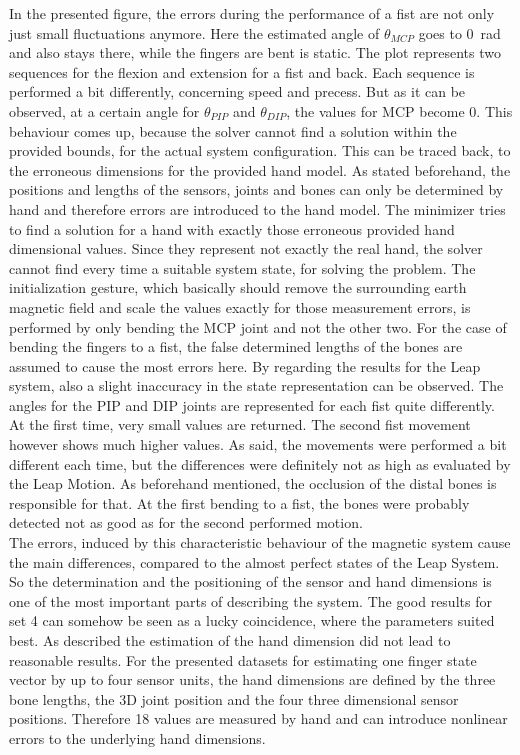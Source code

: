 In the presented figure, the errors during the performance of a fist are not only just small fluctuations anymore. Here the estimated angle of $ \theta_{MCP} $ goes to \SI{0}{\radian} and also stays there, while the fingers are bent is static. The plot represents two sequences for the flexion and extension for a fist and back. Each sequence is performed a bit differently, concerning speed and precess. But as it can be observed, at a certain angle for $ \theta_{PIP} $ and $ \theta_{DIP} $, the values for \ac{MCP} become 0. This behaviour comes up, because the solver cannot find a solution within the provided bounds, for the actual system configuration. This can be traced back, to the erroneous dimensions for the provided hand model. As stated beforehand, the positions and lengths of the sensors, joints and bones can only be determined by hand and therefore errors are introduced to the hand model. The minimizer tries to find a solution for a hand with exactly those erroneous provided hand dimensional values. Since they represent not exactly the real hand, the solver cannot find every time a suitable system state, for solving the problem. The initialization gesture, which basically should remove the surrounding earth magnetic field and scale the values exactly for those measurement errors, is performed by only bending the \ac{MCP} joint and not the other two. For the case of bending the fingers to a fist, the false determined lengths of the bones are assumed to cause the most errors here. By regarding the results for the Leap system, also a slight inaccuracy in the state representation can be observed. The angles for the \ac{PIP} and \ac{DIP} joints are represented for each fist quite differently. At the first time, very small values are returned. The second fist movement however shows much higher values. As said, the movements were performed a bit different each time, but the differences were definitely not as high as evaluated by the Leap Motion. As beforehand mentioned, the occlusion of the distal bones is responsible for that. At the first bending to a fist, the bones were probably detected not as good as for the second performed motion. \\
The errors, induced by this characteristic behaviour of the magnetic system cause the main differences, compared to the almost perfect states of the Leap System. So the determination and the positioning of the sensor and hand dimensions is one of the most important parts of describing the system. The good results for set 4 can somehow be seen as a lucky coincidence, where the parameters suited best. As described  the estimation of the hand dimension did not lead to reasonable results. For the presented datasets for estimating one finger state vector by up to four sensor units, the hand dimensions are defined by the three bone lengths, the 3D joint position and the four three dimensional sensor positions. Therefore 18 values are measured by hand and can introduce nonlinear errors to the underlying hand dimensions.

